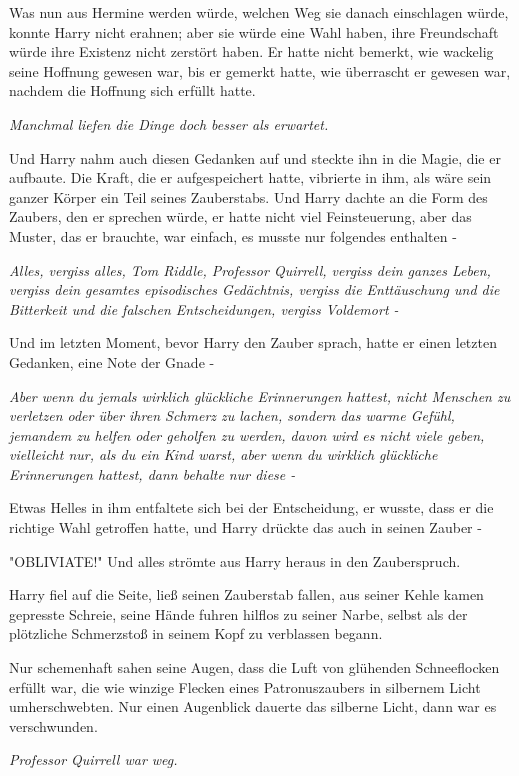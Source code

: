 {Was nun aus Hermine werden würde, welchen Weg sie danach einschlagen würde, konnte Harry nicht erahnen; aber sie würde eine Wahl haben, ihre Freundschaft würde ihre Existenz nicht zerstört haben. Er hatte nicht bemerkt, wie wackelig seine Hoffnung gewesen war, bis er gemerkt hatte, wie überrascht er gewesen war, nachdem die Hoffnung sich erfüllt hatte.

\emph{Manchmal liefen die Dinge doch besser als erwartet.}

Und Harry nahm auch diesen Gedanken auf und steckte ihn in die Magie, die er aufbaute. Die Kraft, die er aufgespeichert hatte, vibrierte in ihm, als wäre sein ganzer Körper ein Teil seines Zauberstabs. Und Harry dachte an die Form des Zaubers, den er sprechen würde, er hatte nicht viel Feinsteuerung, aber das Muster, das er brauchte, war einfach, es musste nur folgendes enthalten -

\emph{Alles, vergiss alles, Tom Riddle, Professor Quirrell, vergiss dein ganzes Leben, vergiss dein gesamtes episodisches Gedächtnis, vergiss die Enttäuschung und die Bitterkeit und die falschen Entscheidungen, vergiss Voldemort -}

Und im letzten Moment, bevor Harry den Zauber sprach, hatte er einen letzten Gedanken, eine Note der Gnade -

\emph{Aber wenn du jemals wirklich glückliche Erinnerungen hattest, nicht Menschen zu verletzen oder über ihren Schmerz zu lachen, sondern das warme Gefühl, jemandem zu helfen oder geholfen zu werden, davon wird es nicht viele geben, vielleicht nur, als du ein Kind warst, aber wenn du wirklich glückliche Erinnerungen hattest, dann behalte nur diese -}

Etwas Helles in ihm entfaltete sich bei der Entscheidung, er wusste, dass er die richtige Wahl getroffen hatte, und Harry drückte das auch in seinen Zauber -

"OBLIVIATE!" Und alles strömte aus Harry heraus in den Zauberspruch.

Harry fiel auf die Seite, ließ seinen Zauberstab fallen, aus seiner Kehle kamen gepresste Schreie, seine Hände fuhren hilflos zu seiner Narbe, selbst als der plötzliche Schmerzstoß in seinem Kopf zu verblassen begann.

Nur schemenhaft sahen seine Augen, dass die Luft von glühenden Schneeflocken erfüllt war, die wie winzige Flecken eines Patronuszaubers in silbernem Licht umherschwebten. Nur einen Augenblick dauerte das silberne Licht, dann war es verschwunden.

\emph{Professor Quirrell war weg.}

}
